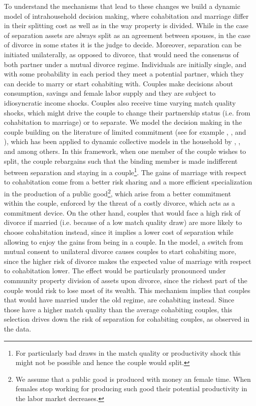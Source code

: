 \documentclass[12pt]{article}
\numberwithin{table}{section}
\begin{document}
To understand the mechanisms that lead to these changes we build a dynamic model of intrahousehold decision making, where cohabitation and marriage differ in their splitting cost as well as in the way property is divided. While in the case of separation assets are always split as an agreement between spouses, in the case of divorce in some states it is the judge to decide. Moreover, separation can be initiated unilaterally, as opposed to divorce, that would need the consensus of both partner under a mutual divorce regime. Individuals are initially single, and with some probability in each period they meet a potential partner, which they can decide to marry or start cohabiting with. Couples make decisions about consumption, savings and female labor supply and they are subject to idiosyncratic income shocks. Couples also receive time varying match quality shocks, which might drive the couple to change their partnership status (i.e. from cohabitation to marriage) or to separate.  We model the decision making in the couple building on the literature of limited commitment (see for example \cite{kk1996},  \cite{ligon2002}, \cite{marcet2019} and \cite{pavoni2018}), which has been applied to dynamic collective models in the household by \cite{voena2015}, \cite{mazzocco2007}, \cite{foerster2019} and \cite{lise2018} among others. In this framework, when one member of the couple wishes to split, the couple rebargains such that the binding member is made indifferent between separation and staying in a couple\footnote{For particularly bad draws in the match quality or productivity shock this might not be possible and hence the couple would split.}. The gains of marriage with respect to cohabitation come from a better risk sharing and a more efficient specialization in the production of a public good\footnote{We assume that a public good is produced with money an female time. When females stop working for producing such good their potential productivity in the labor market decreases.}, which arise from a better commitment within the couple, enforced by the threat of a costly divorce, which acts as a commitment device. On the other hand, couples that would face a high risk of divorce if married (i.e. because of a low match quality draw) are more likely to choose cohabitation instead, since it implies a lower cost of separation while allowing to enjoy the gains from being in a couple. In the model, a switch from mutual consent to unilateral divorce causes couples to start cohabiting more, since the higher risk of divorce makes the expected value of marriage with respect to cohabitation lower. The effect would be particularly pronounced under community property division of assets upon divorce, since the richest part of the couple  would risk to lose most of its wealth. This mechanism implies that couples that would have married under the old regime, are cohabiting instead. Since those have a higher match quality than the average cohabiting couples, this selection drives down the risk of separation for cohabiting couples, as observed in the data.
\end{document}

